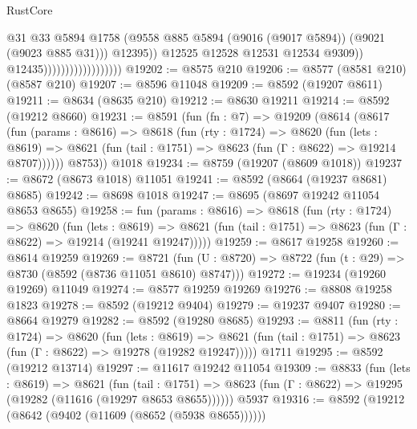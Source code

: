 \begin{lexlean}{RustCore}
\begin{coremodule}
                                                @31
                                                @33
                                                @5894
                                                @1758
                                                (@9558
                                                  @885
                                                  @5894
                                                  (@9016 (@9017 @5894))
                                                  (@9021 (@9023 @885 @31)))
                                                @12395))
                                            @12525
                                            @12528
                                            @12531
                                            @12534
                                            @9309))
                                        @12435))))))))))))))))))
@19202 := @8575 @210
@19206 := @8577 (@8581 @210) (@8587 @210)
@19207 := @8596 @11048
@19209 := @8592 (@19207 @8611)
@19211 := @8634 (@8635 @210)
@19212 := @8630 @19211
@19214 := @8592 (@19212 @8660)
@19231 := @8591
    (fun (fn : @7) =>
    @19209
      (@8614
        (@8617
          (fun (params : @8616) =>
          @8618
            (fun (rty : @1724) =>
            @8620
              (fun (lets : @8619) =>
              @8621 (fun (tail : @1751) => @8623 (fun (Γ : @8622) => @19214 @8707))))))
        @8753))
    @1018
@19234 := @8759 (@19207 (@8609 @1018))
@19237 := @8672 (@8673 @1018) @11051
@19241 := @8592 (@8664 (@19237 @8681) @8685)
@19242 := @8698 @1018
@19247 := @8695 (@8697 @19242 @11054 @8653 @8655)
@19258 := fun (params : @8616) =>
  @8618
    (fun (rty : @1724) =>
    @8620
      (fun (lets : @8619) =>
      @8621 (fun (tail : @1751) => @8623 (fun (Γ : @8622) => @19214 (@19241 @19247)))))
@19259 := @8617 @19258
@19260 := @8614 @19259
@19269 := @8721
    (fun (U : @8720) => @8722 (fun (t : @29) => @8730 (@8592 (@8736 @11051 @8610) @8747)))
@19272 := @19234 (@19260 @19269) @11049
@19274 := @8577 @19259 @19269
@19276 := @8808 @19258 @1823
@19278 := @8592 (@19212 @9404)
@19279 := @19237 @9407
@19280 := @8664 @19279
@19282 := @8592 (@19280 @8685)
@19293 := @8811
    (fun (rty : @1724) =>
    @8620
      (fun (lets : @8619) =>
      @8621 (fun (tail : @1751) => @8623 (fun (Γ : @8622) => @19278 (@19282 @19247)))))
    @1711
@19295 := @8592 (@19212 @13714)
@19297 := @11617 @19242 @11054
@19309 := @8833
    (fun (lets : @8619) =>
    @8621
      (fun (tail : @1751) =>
      @8623 (fun (Γ : @8622) => @19295 (@19282 (@11616 (@19297 @8653 @8655))))))
    @5937
@19316 := @8592 (@19212 (@8642 (@9402 (@11609 (@8652 (@5938 @8655))))))

\end{coremodule}
\end{lexlean}
